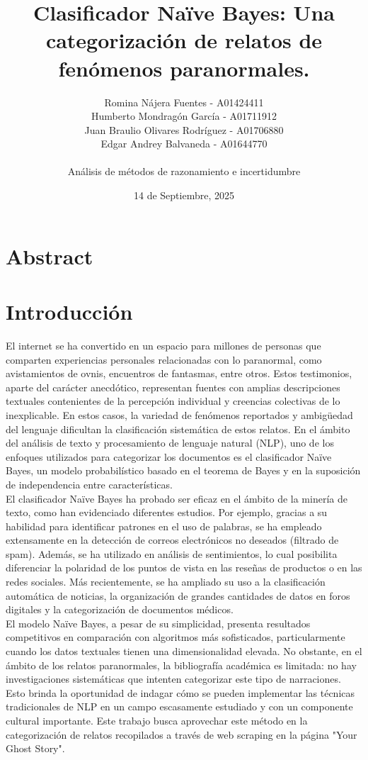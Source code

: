 \documentclass[12pt, letterpaper]{report}
\title{Clasificador Naïve Bayes: Una categorización de relatos de fenómenos paranormales.}
\author{ Romina Nájera Fuentes - A01424411 \\ Humberto Mondragón García - A01711912 \\ Juan Braulio Olivares Rodríguez - A01706880 \\ Edgar Andrey Balvaneda - A01644770
 \\ \\ Análisis de métodos de razonamiento e incertidumbre}
\date{14 de Septiembre, 2025}
\begin{document}
\maketitle
\section*{Abstract}

\section*{Introducción}

El internet se ha convertido en un espacio para millones de personas que comparten experiencias personales relacionadas con lo paranormal, como avistamientos de ovnis, encuentros de fantasmas, entre otros. Estos testimonios, aparte del carácter anecdótico, representan fuentes con amplias descripciones textuales contenientes de la percepción individual y creencias colectivas de lo inexplicable. En estos casos, la variedad de fenómenos reportados y ambigüedad del lenguaje dificultan la clasificación sistemática de estos relatos.
En el ámbito del análisis de texto y procesamiento de lenguaje natural (NLP), uno de los enfoques utilizados para categorizar los documentos es el clasificador Naïve Bayes, un modelo probabilístico basado en el teorema de Bayes y en la suposición de independencia entre características. \\
El clasificador Naïve Bayes ha probado ser eficaz en el ámbito de la minería de texto, como han evidenciado diferentes estudios. Por ejemplo, gracias a su habilidad para identificar patrones en el uso de palabras, se ha empleado extensamente en la detección de correos electrónicos no deseados (filtrado de spam). Además, se ha utilizado en análisis de sentimientos, lo cual posibilita diferenciar la polaridad de los puntos de vista en las reseñas de productos o en las redes sociales. Más recientemente, se ha ampliado su uso a la clasificación automática de noticias, la organización de grandes cantidades de datos en foros digitales y la categorización de documentos médicos. \\
El modelo Naïve Bayes, a pesar de su simplicidad, presenta resultados competitivos en comparación con algoritmos más sofisticados, particularmente cuando los datos textuales tienen una dimensionalidad elevada. No obstante, en el ámbito de los relatos paranormales, la bibliografía académica es limitada: no hay investigaciones sistemáticas que intenten categorizar este tipo de narraciones. Esto brinda la oportunidad de indagar cómo se pueden implementar las técnicas tradicionales de NLP en un campo escasamente estudiado y con un componente cultural importante.
Este trabajo busca aprovechar este método en la categorización de relatos recopilados a través de web scraping  en la página "Your Ghost Story". \\
\end{document}
